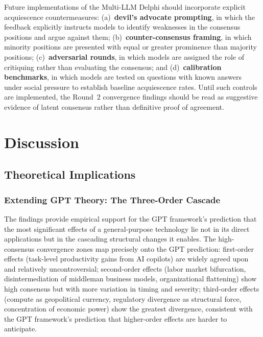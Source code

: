 \documentclass[preprint,review,12pt]{elsarticle}
\begin{document}
Future implementations of the Multi-LLM Delphi should incorporate explicit acquiescence countermeasures: (a)~\textbf{devil's advocate prompting}, in which the feedback explicitly instructs models to identify weaknesses in the consensus positions and argue against them; (b)~\textbf{counter-consensus framing}, in which minority positions are presented with equal or greater prominence than majority positions; (c)~\textbf{adversarial rounds}, in which models are assigned the role of critiquing rather than evaluating the consensus; and (d)~\textbf{calibration benchmarks}, in which models are tested on questions with known answers under social pressure to establish baseline acquiescence rates. Until such controls are implemented, the Round~2 convergence findings should be read as suggestive evidence of latent consensus rather than definitive proof of agreement.


\section{Discussion}
\label{sec:discussion}


\subsection{Theoretical Implications}
\label{sec:theoretical_implications}


\subsubsection{Extending GPT Theory: The Three-Order Cascade}
\label{sec:extending_gpt}

The findings provide empirical support for the GPT framework's prediction that the most significant effects of a general-purpose technology lie not in its direct applications but in the cascading structural changes it enables. The high-consensus convergence zones map precisely onto the GPT prediction: first-order effects (task-level productivity gains from AI copilots) are widely agreed upon and relatively uncontroversial; second-order effects (labor market bifurcation, disintermediation of middleman business models, organizational flattening) show high consensus but with more variation in timing and severity; third-order effects (compute as geopolitical currency, regulatory divergence as structural force, concentration of economic power) show the greatest divergence, consistent with the GPT framework's prediction that higher-order effects are harder to anticipate.
\end{document}
